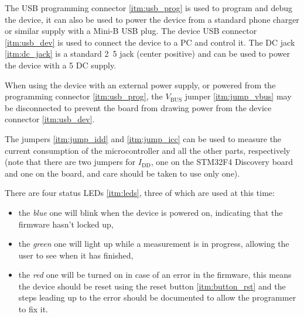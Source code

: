 The USB programming connector \ref{itm:usb_prog} is used to program and debug the device, it can also be used to power
the device from a standard phone charger or similar supply with a Mini-B USB plug.
The device USB connector \ref{itm:usb_dev} is used to connect the device to a PC and control it.
The DC jack \ref{itm:dc_jack} is a standard \unit{2.5}{\milli\meter} jack (center positive) and can be used to
power the device with a \unit{5}{\volt} DC supply.

When using the device with an external power supply, or powered from the programming connector \ref{itm:usb_prog},
the $ V_\text{BUS} $ jumper \ref{itm:jump_vbus} may be disconnected to prevent the board from drawing power from the
device connector \ref{itm:usb_dev}.

The jumpers \ref{itm:jump_idd} and \ref{itm:jump_icc} can be used to measure the current consumption of the
microcontroller and all the other parts, respectively (note that there are two jumpers for $ I_\text{DD} $,
one on the STM32F4 Discovery board and one on the board, and care should be taken to use only one).

There are four status LEDs \ref{itm:leds}, three of which are used at this time:
\begin{itemize}
	\item the \emph{blue} one will blink when the device is powered on, indicating that the firmware hasn't locked up,
  \item the \emph{green} one will light up while a measurement is in progress, allowing the user to see when it has
    finished,
  \item the \emph{red} one will be turned on in case of an error in the firmware, this means the device should be reset
    using the reset button \ref{itm:button_rst} and the steps leading up to the error should be documented to allow
    the programmer to fix it.
\end{itemize}
